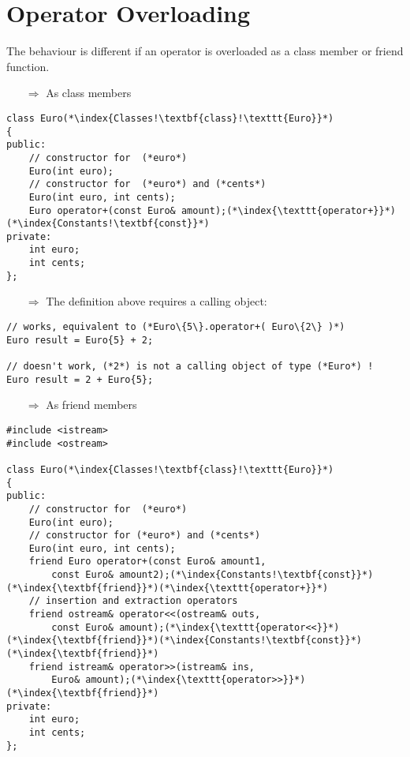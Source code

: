 \documentclass[10pt]{book}
\begin{document}
\section{Operator Overloading}
The behaviour is different if an operator is overloaded as  a class member or friend function.
\begin{enumerate}
\item[$\Rightarrow$] As class members
\end{enumerate}
\begin{lstlisting}
class Euro(*\index{Classes!\textbf{class}!\texttt{Euro}}*)
{
public:
    // constructor for  (*euro*)
    Euro(int euro);
    // constructor for  (*euro*) and (*cents*)
    Euro(int euro, int cents);
    Euro operator+(const Euro& amount);(*\index{\texttt{operator+}}*)(*\index{Constants!\textbf{const}}*)
private:
    int euro;
    int cents;
};
\end{lstlisting}
\begin{enumerate}
\item[$\Rightarrow$] The definition above requires a calling object:
\end{enumerate}
\begin{lstlisting}
// works, equivalent to (*Euro\{5\}.operator+( Euro\{2\} )*)
Euro result = Euro{5} + 2; 

// doesn't work, (*2*) is not a calling object of type (*Euro*) !
Euro result = 2 + Euro{5}; 
\end{lstlisting}
\begin{enumerate}
\item[$\Rightarrow$] As friend members
\end{enumerate}
\begin{lstlisting}
#include <istream>
#include <ostream>

class Euro(*\index{Classes!\textbf{class}!\texttt{Euro}}*)
{
public:
    // constructor for  (*euro*)
    Euro(int euro);
    // constructor for (*euro*) and (*cents*)
    Euro(int euro, int cents);
    friend Euro operator+(const Euro& amount1,
        const Euro& amount2);(*\index{Constants!\textbf{const}}*)(*\index{\textbf{friend}}*)(*\index{\texttt{operator+}}*)
    // insertion and extraction operators
    friend ostream& operator<<(ostream& outs,
        const Euro& amount);(*\index{\texttt{operator<<}}*)(*\index{\textbf{friend}}*)(*\index{Constants!\textbf{const}}*)(*\index{\textbf{friend}}*)
    friend istream& operator>>(istream& ins,
        Euro& amount);(*\index{\texttt{operator>>}}*)(*\index{\textbf{friend}}*)
private:
    int euro;
    int cents;
};
\end{lstlisting}
\end{document}
